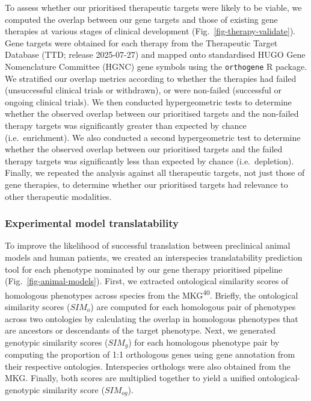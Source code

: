 \documentclass[
]{article}
\begin{document}
To assess whether our prioritised therapeutic targets were likely to be
viable, we computed the overlap between our gene targets and those of
existing gene therapies at various stages of clinical development
(Fig.~\ref{fig-therapy-validate}). Gene targets were obtained for each
therapy from the Therapeutic Target Database (TTD; release 2025-07-27)
and mapped onto standardised HUGO Gene Nomenclature Committee (HGNC)
gene symbols using the \texttt{orthogene} R package. We stratified our
overlap metrics according to whether the therapies had failed
(unsuccessful clinical trials or withdrawn), or were non-failed
(successful or ongoing clinical trials). We then conducted
hypergeometric tests to determine whether the observed overlap between
our prioritised targets and the non-failed therapy targets was
significantly greater than expected by chance (i.e.~enrichment). We also
conducted a second hypergeometric test to determine whether the observed
overlap between our prioritised targets and the failed therapy targets
was significantly less than expected by chance (i.e.~depletion).
Finally, we repeated the analysis against all therapeutic targets, not
just those of gene therapies, to determine whether our prioritised
targets had relevance to other therapeutic modalities.

\subsubsection{Experimental model
translatability}\label{experimental-model-translatability-1}

To improve the likelihood of successful translation between preclinical
animal models and human patients, we created an interspecies
translatability prediction tool for each phenotype nominated by our gene
therapy prioritised pipeline (Fig.~\ref{fig-animal-models}). First, we
extracted ontological similarity scores of homologous phenotypes across
species from the MKG\textsuperscript{40}. Briefly, the ontological
similarity scores (\(SIM_o\)) are computed for each homologous pair of
phenotypes across two ontologies by calculating the overlap in
homologous phenotypes that are ancestors or descendants of the target
phenotype. Next, we generated genotypic similarity scores (\(SIM_g\))
for each homologous phenotype pair by computing the proportion of 1:1
orthologous genes using gene annotation from their respective
ontologies. Interspecies orthologs were also obtained from the MKG.
Finally, both scores are multiplied together to yield a unified
ontological-genotypic similarity score (\(SIM_{og}\)).
\end{document}
